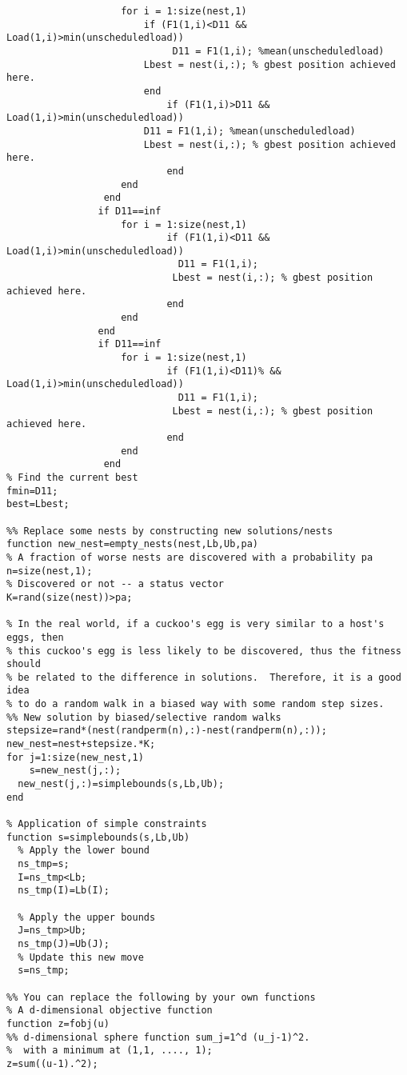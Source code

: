 \begin{linenumbers}
\begin{lstlisting}
                    for i = 1:size(nest,1)
                        if (F1(1,i)<D11 && Load(1,i)>min(unscheduledload))		
                             D11 = F1(1,i); %mean(unscheduledload)		
                        Lbest = nest(i,:); % gbest position achieved here.    		
                        end
                            if (F1(1,i)>D11 && Load(1,i)>min(unscheduledload))		
                        D11 = F1(1,i); %mean(unscheduledload)		
                        Lbest = nest(i,:); % gbest position achieved here.    	
                            end	
                    end
                 end	
                if D11==inf		
                    for i = 1:size(nest,1)		
                            if (F1(1,i)<D11 && Load(1,i)>min(unscheduledload))		
                              D11 = F1(1,i);		
                             Lbest = nest(i,:); % gbest position achieved here.    		
                            end		
                    end		
                end
                if D11==inf		
                    for i = 1:size(nest,1)		
                            if (F1(1,i)<D11)% && Load(1,i)>min(unscheduledload))		
                              D11 = F1(1,i);		
                             Lbest = nest(i,:); % gbest position achieved here.    		
                            end		
                    end		
                 end
% Find the current best
fmin=D11;
best=Lbest;

%% Replace some nests by constructing new solutions/nests
function new_nest=empty_nests(nest,Lb,Ub,pa)
% A fraction of worse nests are discovered with a probability pa
n=size(nest,1);
% Discovered or not -- a status vector
K=rand(size(nest))>pa;

% In the real world, if a cuckoo's egg is very similar to a host's eggs, then
% this cuckoo's egg is less likely to be discovered, thus the fitness should
% be related to the difference in solutions.  Therefore, it is a good idea
% to do a random walk in a biased way with some random step sizes.
%% New solution by biased/selective random walks
stepsize=rand*(nest(randperm(n),:)-nest(randperm(n),:));
new_nest=nest+stepsize.*K;
for j=1:size(new_nest,1)
    s=new_nest(j,:);
  new_nest(j,:)=simplebounds(s,Lb,Ub);
end

% Application of simple constraints
function s=simplebounds(s,Lb,Ub)
  % Apply the lower bound
  ns_tmp=s;
  I=ns_tmp<Lb;
  ns_tmp(I)=Lb(I);

  % Apply the upper bounds
  J=ns_tmp>Ub;
  ns_tmp(J)=Ub(J);
  % Update this new move
  s=ns_tmp;

%% You can replace the following by your own functions
% A d-dimensional objective function
function z=fobj(u)
%% d-dimensional sphere function sum_j=1^d (u_j-1)^2.
%  with a minimum at (1,1, ...., 1);
z=sum((u-1).^2);
\end{lstlisting}
\end{linenumbers} 